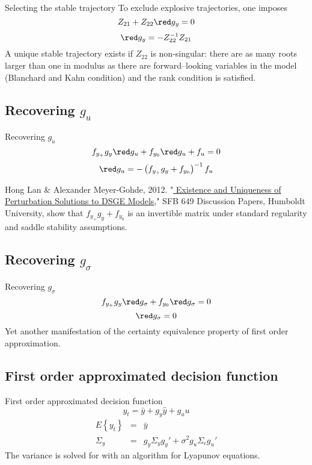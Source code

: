 \documentclass{beamer}
\begin{document}
\begin{slide}{Selecting the stable trajectory}
To exclude explosive trajectories, one imposes
\[
Z_{21}+Z_{22}{\red g_y}=0
\]
\[
{\red g_y}=-Z_{22}^{-1}Z_{21}
\]
A unique stable trajectory exists if $Z_{22}$ is non-singular: there are as many roots larger than one in modulus as there are forward--looking variables in the model (Blanchard and Kahn condition) and the rank condition is satisfied.
\end{slide}

\subsection[Recovering $g_u$]{Recovering $g_u$}
\begin{slide}{Recovering $g_u$}
\[
f_{y_+}g_y{\red g_u}+f_{y_0}{\red g_u}+f_{u}=0
\]
\[
{\red g_u} = -\left(f_{y_+}g_y+f_{y_0}\right)^{-1}f_u
\]

{\footnotesize Hong Lan \& Alexander Meyer-Gohde,
2012. "\href{http://sfb649.wiwi.hu-berlin.de/papers/pdf/SFB649DP2012-015.pdf}{\blue
  Existence and Uniqueness of
Perturbation Solutions to DSGE Models}," SFB 649 Discussion Papers,
Humboldt University, show that $f_{y_+}g_y+f_{y_0}$ is an invertible
matrix under standard regularity and saddle stability assumptions.}
\end{slide}

\subsection[Recovering $g_\sigma$]{Recovering $g_\sigma$}
\begin{slide}{Recovering $g_\sigma$}
\[
f_{y_+}g_y{\red g_\sigma}+f_{y_0}{\red g_\sigma} = 0
\]
\[
{\red g_\sigma} = 0
\]
Yet another manifestation of the certainty equivalence property of first order approximation.
\end{slide}

\subsection[First order approximated decision function]{First order approximated decision function}
\begin{slide}{First order approximated decision function}
\[
y_t = \bar y+g_y\hat y+g_uu
\]
\begin{eqnarray*}
  E\left\{y_t\right\} &=& \bar y\\
  \Sigma_y &=& g_y \Sigma_y g_y'+\sigma^2g_u\Sigma_\epsilon g_u'
\end{eqnarray*}
The variance is solved for with an algorithm for Lyapunov equations.
\end{slide}
\end{document}
